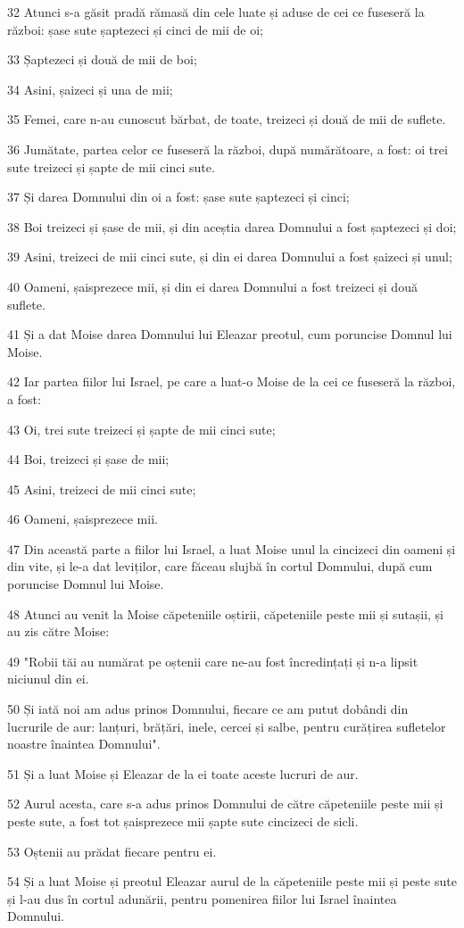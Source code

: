 \par 32 Atunci s-a găsit pradă rămasă din cele luate și aduse de cei ce fuseseră la război: șase sute șaptezeci și cinci de mii de oi;
\par 33 Șaptezeci și două de mii de boi;
\par 34 Asini, șaizeci și una de mii;
\par 35 Femei, care n-au cunoscut bărbat, de toate, treizeci și două de mii de suflete.
\par 36 Jumătate, partea celor ce fuseseră la război, după numărătoare, a fost: oi trei sute treizeci și șapte de mii cinci sute.
\par 37 Și darea Domnului din oi a fost: șase sute șaptezeci și cinci;
\par 38 Boi treizeci și șase de mii, și din aceștia darea Domnului a fost șaptezeci și doi;
\par 39 Asini, treizeci de mii cinci sute, și din ei darea Domnului a fost șaizeci și unul;
\par 40 Oameni, șaisprezece mii, și din ei darea Domnului a fost treizeci și două suflete.
\par 41 Și a dat Moise darea Domnului lui Eleazar preotul, cum poruncise Domnul lui Moise.
\par 42 Iar partea fiilor lui Israel, pe care a luat-o Moise de la cei ce fuseseră la război, a fost:
\par 43 Oi, trei sute treizeci și șapte de mii cinci sute;
\par 44 Boi, treizeci și șase de mii;
\par 45 Asini, treizeci de mii cinci sute;
\par 46 Oameni, șaisprezece mii.
\par 47 Din această parte a fiilor lui Israel, a luat Moise unul la cincizeci din oameni și din vite, și le-a dat leviților, care făceau slujbă în cortul Domnului, după cum poruncise Domnul lui Moise.
\par 48 Atunci au venit la Moise căpeteniile oștirii, căpeteniile peste mii și sutașii, și au zis către Moise:
\par 49 "Robii tăi au numărat pe oștenii care ne-au fost încredințați și n-a lipsit niciunul din ei.
\par 50 Și iată noi am adus prinos Domnului, fiecare ce am putut dobândi din lucrurile de aur: lanțuri, brățări, inele, cercei și salbe, pentru curățirea sufletelor noastre înaintea Domnului".
\par 51 Și a luat Moise și Eleazar de la ei toate aceste lucruri de aur.
\par 52 Aurul acesta, care s-a adus prinos Domnului de către căpeteniile peste mii și peste sute, a fost tot șaisprezece mii șapte sute cincizeci de sicli.
\par 53 Oștenii au prădat fiecare pentru ei.
\par 54 Și a luat Moise și preotul Eleazar aurul de la căpeteniile peste mii și peste sute și l-au dus în cortul adunării, pentru pomenirea fiilor lui Israel înaintea Domnului.

